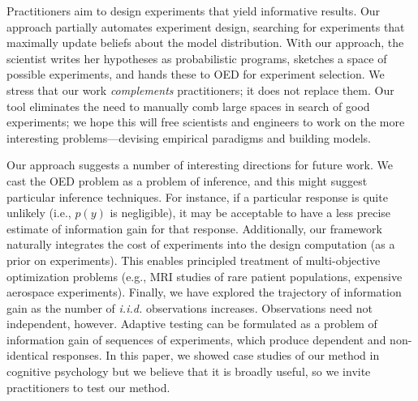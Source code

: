 \documentclass{article}
\begin{document}
Practitioners aim to design experiments that yield informative results.
Our approach partially automates experiment design, searching for experiments that maximally update beliefs about the model distribution.
With our approach, the scientist writes her hypotheses as probabilistic programs, sketches a space of possible experiments, and hands these to OED for experiment selection.
We stress that our work \emph{complements} practitioners; it does not replace them.
Our tool eliminates the need to manually comb large spaces in search of good experiments; we hope this will free scientists and engineers to work on the more interesting problems---devising empirical paradigms and building models.

Our approach suggests a number of interesting directions for future work.
We cast the OED problem as a problem of inference, and this might suggest particular inference techniques.
For instance, if a particular response is quite unlikely (i.e., $p(y)$ is negligible), it may be acceptable to have a less precise estimate of information gain for that response.
Additionally, our framework naturally integrates the cost of experiments into the design computation (as a prior on experiments).
This enables principled treatment of multi-objective optimization problems (e.g., MRI studies of rare patient populations, expensive aerospace experiments).
Finally, we have explored the trajectory of information gain as the number of \emph{i.i.d.} observations increases.
Observations need not independent, however.
Adaptive testing can be formulated as a problem of information gain of sequences of experiments, which produce dependent and non-identical responses.
In this paper, we showed case studies of our method in cognitive psychology but we believe that it is broadly useful, so we invite practitioners to test our method.



\end{document}
